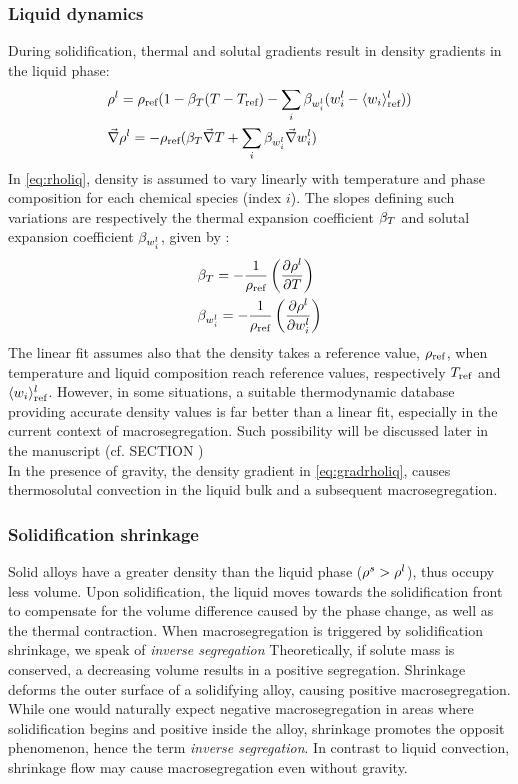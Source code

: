 \subsubsection*{Liquid dynamics}
During solidification, thermal and solutal gradients result in density gradients in the liquid phase: 
\begin{subequations}
\begin{align}
\label{eq:rholiq}
& \rho^l = \rho_{\text{ref}} ( 1 - \beta_T (T - T_{\text{ref}}) - \sum_{i} \beta_{w_i^l} (w_i^l - \langle w_i \rangle_{\text{ref}}^l) )  \\ 
\label{eq:gradrholiq}
& \vec{\nabla}\rho^l = -\rho_{\text{ref}} (  \beta_T \vec{\nabla} T + \sum_{i} \beta_{w_i^l} \vec{\nabla}w_i^l  )
\end{align}
\end{subequations}
%
In \cref{eq:rholiq}, density is assumed to vary linearly with temperature and phase composition 
for each chemical species (index $i$). The slopes defining such variations are respectively the 
thermal expansion coefficient $\beta_T$ and solutal expansion coefficient $\beta_{w_i^l}$, given by 
\citep{kohler_peritectic_2008}:
%
\begin{subequations}
\begin{align}
\label{eq:betaT}
& \beta_T =  -\frac{1}{\rho_{\text{ref}}} \left( \frac{\partial\rho^l}{\partial T} \right)  \\ 
\label{eq:betawil}
& \beta_{w_i^l} = -\frac{1}{\rho_{\text{ref}}} \left( \frac{\partial \rho^l}{\partial w_i^l} \right)  
\end{align}
\end{subequations}
%
The linear fit assumes also that the density takes a reference value, $\rho_{\text{ref}}$, when temperature 
and liquid composition reach reference values, respectively $T_{\text{ref}}$ and $\langle w_i \rangle_{\text{ref}}^l$. However, in some 
situations, a suitable thermodynamic database providing accurate density values is far better than a 
linear fit, especially in the current context of macrosegregation. 
Such possibility will be discussed later in the manuscript (cf. SECTION )\\ %
In the presence of gravity, the density gradient in \cref{eq:gradrholiq}, causes thermosolutal convection 
in the liquid bulk and a subsequent macrosegregation.
%
% 
\subsubsection*{Solidification shrinkage}
Solid alloys have a greater density than the liquid phase ($\rho^s > \rho^l$), thus occupy less volume. 
Upon solidification, the liquid moves towards the solidification front to compensate for the volume 
difference caused by the phase change, as well as the thermal contraction. When macrosegregation is 
triggered by solidification shrinkage, we speak of \emph{inverse segregation} Theoretically, if solute 
mass is conserved, a decreasing volume results in a positive segregation. Shrinkage deforms the outer
surface of a solidifying alloy, causing positive macrosegregation. While one would naturally expect 
negative macrosegregation in areas where solidification begins and positive inside the alloy, shrinkage 
promotes the opposit phenomenon, hence the term \emph{inverse segregation}.
In contrast to liquid convection, shrinkage flow may cause macrosegregation even without gravity.
%
%
